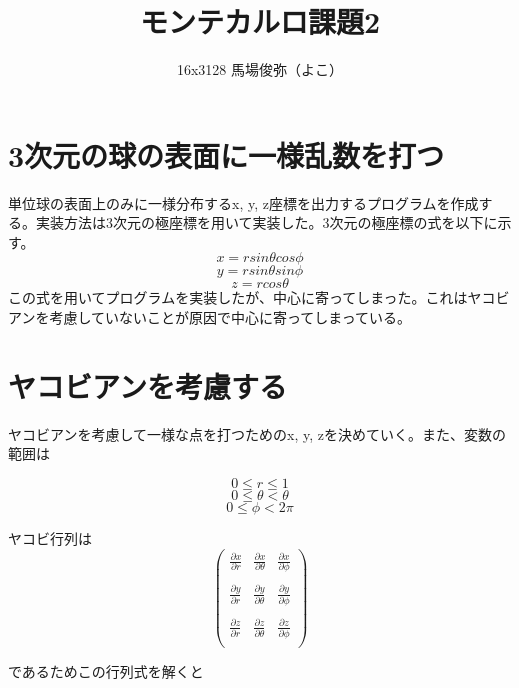 \documentclass[dvipdfmx,autodetect-engine,twocolumn,10pt]{jsarticle}%
\title{モンテカルロ課題2}
\author{16x3128 馬場俊弥（よこ）}
\date{}
\begin{document}
\maketitle
\section{3次元の球の表面に一様乱数を打つ}
単位球の表面上のみに一様分布するx, y, z座標を出力するプログラムを作成する。実装方法は3次元の極座標を用いて実装した。3次元の極座標の式を以下に示す。
\[x = rsin\theta cos\phi \]
\[y = rsin\theta sin\phi \]
\[z = rcos\theta \]
この式を用いてプログラムを実装したが、中心に寄ってしまった。これはヤコビアンを考慮していないことが原因で中心に寄ってしまっている。

\section{ヤコビアンを考慮する}
ヤコビアンを考慮して一様な点を打つためのx, y, zを決めていく。また、変数の範囲は

\[0 \leq r \leq 1 \]
\[0 \leq \theta < \theta \]
\[0 \leq \phi < 2\pi \]

ヤコビ行列は
\begin{equation}
\begin{pmatrix}
\displaystyle \frac{\partial x}{\partial r} & \displaystyle \frac{\partial x}{\partial \theta} & \displaystyle \frac{\partial x}{\partial \phi}\\
&&\\
\displaystyle \frac{\partial y}{\partial r} & \displaystyle \frac{\partial y}{\partial \theta} & \displaystyle \frac{\partial y}{\partial \phi}\\
&&\\
\displaystyle \frac{\partial z}{\partial r} & \displaystyle \frac{\partial z}{\partial \theta} & \displaystyle \frac{\partial z}{\partial \phi}\\
\end{pmatrix}
\nonumber
\end{equation}

であるためこの行列式を解くと
\end{document}
